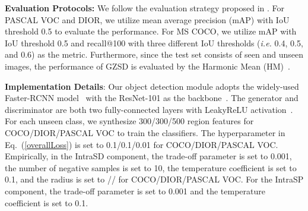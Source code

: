 \documentclass[10pt,twocolumn,letterpaper]{article}
\begin{document}
\textbf{Evaluation Protocols:} We follow the evaluation strategy proposed in \cite{bansal2018zero, Demirel2018ZeroShotOD}. For PASCAL VOC and DIOR, we utilize mean average precision (mAP) with IoU threshold 0.5 to evaluate the performance. For MS COCO, we utilize mAP with IoU threshold 0.5 and recall@100 with three different IoU thresholds (\emph{i.e.} 0.4, 0.5, and 0.6) as the metric. Furthermore, since the test set consists of seen and unseen images, the performance of GZSD is evaluated by the Harmonic Mean (HM)~\cite{han2021contrastive}.

\textbf{Implementation Details}: Our object detection module adopts the widely-used Faster-RCNN model~\cite{ren2016faster} with the ResNet-101 as the backbone~\cite{he2016deep}. The generator  and discriminator  are both two fully-connected layers with LeakyReLU activation~\cite{maas2013rectifier}. For each unseen class, we synthesize 300/300/500 region features for COCO/DIOR/PASCAL VOC to train the classifiers. The hyperparameter  in Eq.~(\ref{overallLoss}) is set to 0.1/0.1/0.01 for COCO/DIOR/PASCAL VOC. Empirically, in the IntraSD component, the trade-off parameter  is set to 0.001, the number of negative samples  is set to 10, the temperature coefficient  is set to 0.1, and the radius  is set to // for COCO/DIOR/PASCAL VOC. For the IntraSP component, the trade-off parameter  is set to 0.001 and the temperature coefficient  is set to 0.1. 
\end{document}
